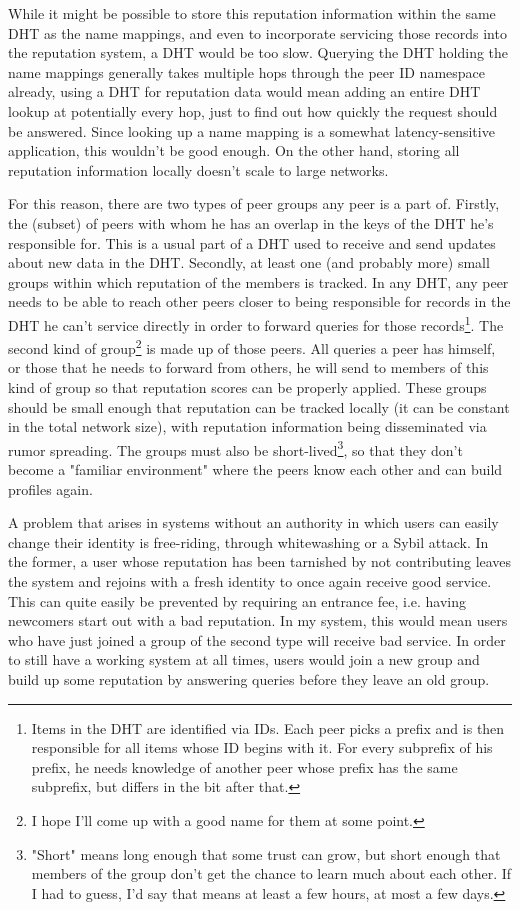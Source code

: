 \documentclass[10pt]{article}
\begin{document}
While it might be possible to store this reputation information within the same
DHT as the name mappings, and even to incorporate servicing those records into
the reputation system, a DHT would be too slow. Querying the DHT holding the
name mappings generally takes multiple hops through the peer ID namespace
already, using a DHT for reputation data would mean adding an entire DHT lookup
at potentially every hop, just to find out how quickly the request should be
answered. Since looking up a name mapping is a somewhat latency-sensitive
application, this wouldn't be good enough. On the other hand, storing all
reputation information locally doesn't scale to large networks.

For this reason, there are two types of peer groups any peer is a part of.
Firstly, the (subset) of peers with whom he has an overlap in the keys of the
DHT he's responsible for. This is a usual part of a DHT used to receive and send
updates about new data in the DHT. Secondly, at least one (and probably more)
small groups within which reputation of the members is tracked. In any DHT, any
peer needs to be able to reach other peers closer to being responsible for
records in the DHT he can't service directly in order to forward queries for
those records\footnote{Items in the DHT are identified via IDs. Each peer picks
a prefix and is then responsible for all items whose ID begins with it. For
every subprefix of his prefix, he needs knowledge of another peer whose prefix
has the same subprefix, but differs in the bit after that.}.  The second kind of
group\footnote{I hope I'll come up with a good name for them at some point.} is
made up of those peers. All queries a peer has himself, or those that he needs
to forward from others, he will send to members of this kind of group so that
reputation scores can be properly applied. These groups should be small enough
that reputation can be tracked locally (it can be constant in the total network
size), with reputation information being disseminated via rumor spreading. The
groups must also be short-lived\footnote{"Short" means long enough that some
trust can grow, but short enough that members of the group don't get the chance
to learn much about each other. If I had to guess, I'd say that means at least a
few hours, at most a few days.}, so that they don't become a "familiar
environment" where the peers know each other and can build profiles again.

A problem that arises in systems without an authority in which users can easily
change their identity is free-riding, through whitewashing or a Sybil attack. In
the former, a user whose reputation has been tarnished by not contributing
leaves the system and rejoins with a fresh identity to once again receive good
service. This can quite easily be prevented by requiring an entrance fee, i.e.
having newcomers start out with a bad reputation. In my system, this would mean
users who have just joined a group of the second type will receive bad service.
In order to still have a working system at all times, users would join a new
group and build up some reputation by answering queries before they leave an old
group.
\end{document}
